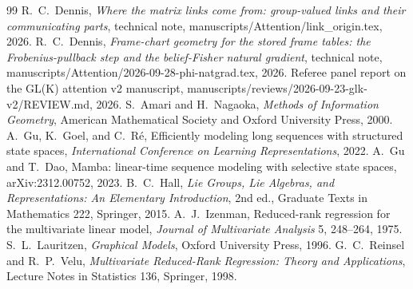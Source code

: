 \documentclass[11pt]{article}
\theoremstyle{definition}
\theoremstyle{remark}
\begin{document}
\begin{thebibliography}{99}
 R.~C.~Dennis, \emph{Where the matrix links come from: group-valued links and their communicating parts}, technical note, manuscripts/Attention/link\_origin.tex, 2026.
 R.~C.~Dennis, \emph{Frame-chart geometry for the stored frame tables: the Frobenius-pullback step and the belief-Fisher natural gradient}, technical note, manuscripts/Attention/2026-09-28-phi-natgrad.tex, 2026.
 Referee panel report on the GL(K) attention v2 manuscript, manuscripts/reviews/2026-09-23-glk-v2/REVIEW.md, 2026.
 S.~Amari and H.~Nagaoka, \emph{Methods of Information Geometry}, American Mathematical Society and Oxford University Press, 2000.
 A.~Gu, K.~Goel, and C.~R{\'e}, Efficiently modeling long sequences with structured state spaces, \emph{International Conference on Learning Representations}, 2022.
 A.~Gu and T.~Dao, Mamba: linear-time sequence modeling with selective state spaces, arXiv:2312.00752, 2023.
 B.~C.~Hall, \emph{Lie Groups, Lie Algebras, and Representations: An Elementary Introduction}, 2nd ed., Graduate Texts in Mathematics 222, Springer, 2015.
 A.~J.~Izenman, Reduced-rank regression for the multivariate linear model, \emph{Journal of Multivariate Analysis} 5, 248--264, 1975.
 S.~L.~Lauritzen, \emph{Graphical Models}, Oxford University Press, 1996.
 G.~C.~Reinsel and R.~P.~Velu, \emph{Multivariate Reduced-Rank Regression: Theory and Applications}, Lecture Notes in Statistics 136, Springer, 1998.
\end{thebibliography}
\end{document}
